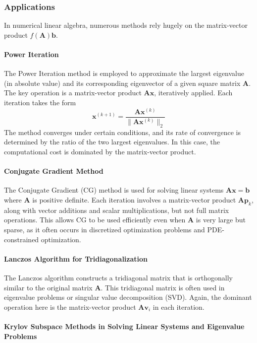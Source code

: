 \documentclass[11pt]{article}
\numberwithin{equation}{section}
\begin{document}
\subsubsection{Applications}
In numerical linear algebra, numerous methods rely hugely on the matrix-vector product $f(\mathbf{A})\mathbf{b}$.
\paragraph{Power Iteration}
The Power Iteration method is employed to approximate the largest eigenvalue (in absolute value) and its corresponding eigenvector of a given square matrix $\mathbf{A}$. The key operation is a matrix-vector product $\mathbf{A}\mathbf{x}$, iteratively applied. Each iteration takes the form
\begin{equation}
    \mathbf{x}^{(k+1)} = \frac{\mathbf{A}\mathbf{x}^{(k)}}{\|\mathbf{A}\mathbf{x}^{(k)}\|_2}
\end{equation}
The method converges under certain conditions, and its rate of convergence is determined by the ratio of the two largest eigenvalues. In this case, the computational cost is dominated by the matrix-vector product.
\paragraph{Conjugate Gradient Method}

The Conjugate Gradient (CG) method is used for solving linear systems $\mathbf{A}\mathbf{x} = \mathbf{b}$ where $\mathbf{A}$ is positive definite. Each iteration involves a matrix-vector product $\mathbf{A}\mathbf{p}_k$, along with vector additions and scalar multiplications, but not full matrix operations. This allows CG to be used efficiently even when $\mathbf{A}$ is very large but sparse, as it often occurs in discretized optimization problems and PDE-constrained optimization.
\paragraph{Lanczos Algorithm for Tridiagonalization}

The Lanczos algorithm constructs a tridiagonal matrix that is orthogonally similar to the original matrix $\mathbf{A}$. This tridiagonal matrix is often used in eigenvalue problems or singular value decomposition (SVD). Again, the dominant operation here is the matrix-vector product $\mathbf{A}\mathbf{v}_i$ in each iteration.

\paragraph{Krylov Subspace Methods in Solving Linear Systems and Eigenvalue Problems}
\end{document}
